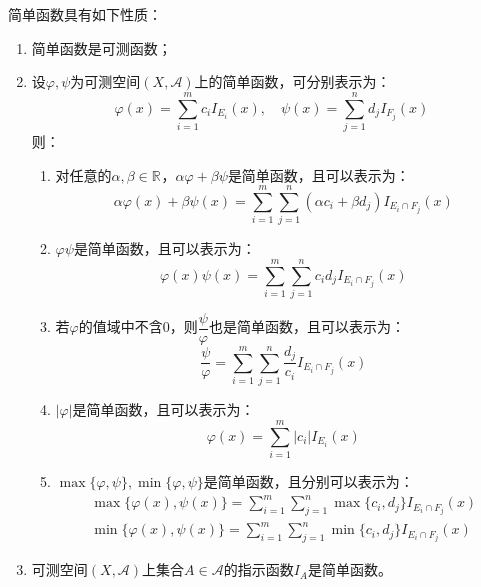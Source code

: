 \begin{property}\label{prop:SimpleFunction}
	简单函数具有如下性质：
	\begin{enumerate}
		\item 简单函数是可测函数；
		\item 设$\varphi,\psi$为可测空间$(X,\mathscr{A})$上的简单函数，可分别表示为：
		\begin{equation*}
			\varphi(x)=\sum_{i=1}^{m}c_iI_{E_i}(x),\quad
			\psi(x)=\sum_{j=1}^{n}d_jI_{F_j}(x)
		\end{equation*}
		则：
		\begin{enumerate}
			\item 对任意的$\alpha,\beta\in\mathbb{R}^{}$，$\alpha\varphi+\beta\psi$是简单函数，且可以表示为：
			\begin{equation*}
				\alpha\varphi(x)+\beta\psi(x)=\sum_{i=1}^{m}\sum_{j=1}^{n}(\alpha c_i+\beta d_j)I_{E_i\cap F_j}(x)
			\end{equation*}
			\item $\varphi\psi$是简单函数，且可以表示为：
			\begin{equation*}
					\varphi(x)\psi(x)=\sum_{i=1}^{m}\sum_{j=1}^{n}c_id_jI_{E_i\cap F_j}(x)
			\end{equation*}
			\item 若$\varphi$的值域中不含$0$，则$\dfrac{\psi}{\varphi}$也是简单函数，且可以表示为：
			\begin{equation*}
				\frac{\psi}{\varphi}=\sum_{i=1}^{m}\sum_{j=1}^{n}\frac{d_j}{c_i}I_{E_i\cap F_j}(x)
			\end{equation*}
			\item $|\varphi|$是简单函数，且可以表示为：
			\begin{equation*}
				\varphi(x)=\sum_{i=1}^{m}|c_i|I_{E_i}(x)
			\end{equation*}
			\item $\max\{\varphi,\psi\},\min\{\varphi,\psi\}$是简单函数，且分别可以表示为：
			\begin{gather*}
				\max\{\varphi(x),\psi(x)\}=\sum_{i=1}^{m}\sum_{j=1}^{n}\max\{c_i,d_j\}I_{E_i\cap F_j}(x) \\
				\min\{\varphi(x),\psi(x)\}=\sum_{i=1}^{m}\sum_{j=1}^{n}\min\{c_i,d_j\}I_{E_i\cap F_j}(x)
			\end{gather*}
		\end{enumerate}
		\item 可测空间$(X,\mathscr{A})$上集合$A\in\mathscr{A}$的指示函数$I_A$是简单函数。
	\end{enumerate}
\end{property}
